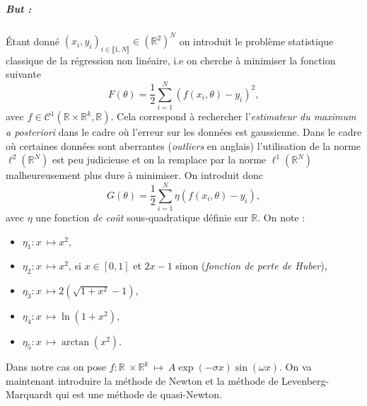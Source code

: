 \documentclass[a4paper,french,12pt]{article}
\begin{document}
\subparagraph{But :} Étant donné $(x_i,y_i)_{i \in \llbracket 1,N \rrbracket} \in \left(\mathbb{R}^2\right)^N$ on introduit le problème statistique classique de la régression non linéaire, i.e on cherche à minimiser la fonction suivante
\[ F(\theta) = \frac{1}{2} \sum_{i=1}^N (f(x_i, \theta) - y_i)^2, \]
avec $f \in \mathcal{C}^1(\mathbb{R} \times \mathbb{R}^k, \mathbb{R})$. Cela correspond à rechercher l'\textit{estimateur du maximum a posteriori} dans le cadre où l'erreur sur les données est gaussienne. Dans le cadre où certaines données sont aberrantes (\textit{outliers} en anglais) l'utilisation de la norme $\ell^2(\mathbb{R}^N)$ est peu judicieuse et on la remplace par la norme $\ell^1(\mathbb{R}^N)$ malheureusement plus dure à minimiser. On introduit donc
\[ G(\theta) = \frac{1}{2} \sum_{i=1}^N \eta\left(f(x_i, \theta) - y_i\right), \]
avec $\eta$ une fonction \textit{de coût} sous-quadratique définie sur $\mathbb{R}$. On note :
\begin{itemize}
\item $\eta_1 : x \ \mapsto x^2$,
\item $\eta_2 : x \ \mapsto x^2$, si $x\in [0,1]$ et $2x - 1$ sinon (\textit{fonction de perte de Huber}),
\item $\eta_3 : x \ \mapsto 2(\sqrt{1+x^2} -1)$,
\item $\eta_4 : x \ \mapsto \ln(1+x^2)$,
\item $\eta_5 : x \ \mapsto \arctan{(x^2)}$.
\end{itemize}
Dans notre cas on pose $f : \mathbb{R} \ \times \mathbb{R}^k \ \mapsto \ A \exp(-\sigma x) \sin(\omega x)$. On va maintenant introduire la méthode de Newton et la méthode de Levenberg-Marquardt qui est une méthode de quasi-Newton.
\end{document}
